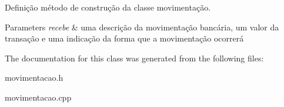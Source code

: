 Definição método de construção da classe movimentação. 


\begin{DoxyParams}{Parameters}
{\em recebe} & uma descrição da movimentação bancária, um valor da transação e uma indicação da forma que a movimentação ocorrerá \\
\hline
\end{DoxyParams}


The documentation for this class was generated from the following files\+:\begin{DoxyCompactItemize}
\item 
movimentacao.\+h\item 
movimentacao.\+cpp\end{DoxyCompactItemize}
